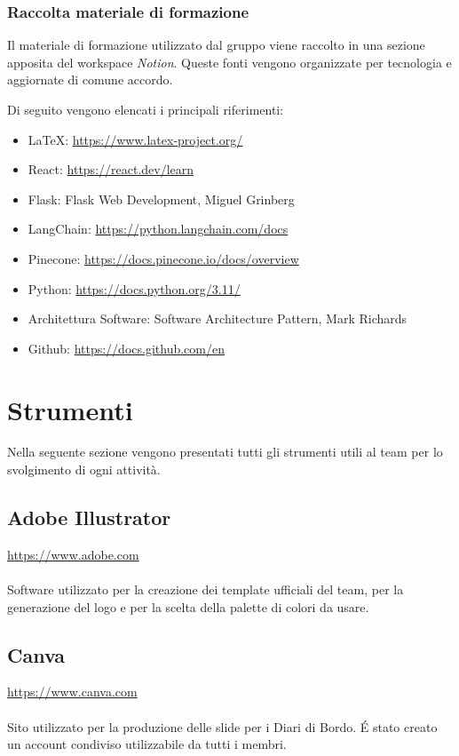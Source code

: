 \documentclass[10pt, a4paper]{article}
\begin{document}
\subsubsection{Raccolta materiale di formazione}
Il materiale di formazione utilizzato dal gruppo viene raccolto in una sezione apposita del workspace \textit{Notion}.
Queste fonti vengono organizzate per tecnologia e aggiornate di comune accordo.

Di seguito vengono elencati i principali riferimenti:
\begin{itemize}
    \item \LaTeX: \href{https://www.latex-project.org/}{https://www.latex-project.org/}
    \item React: \href{https://react.dev/learn}{https://react.dev/learn}
    \item Flask: Flask Web Development, Miguel Grinberg
    \item LangChain: \href{https://python.langchain.com/docs}{https://python.langchain.com/docs}
    \item Pinecone: \href{https://docs.pinecone.io/docs/overview}{https://docs.pinecone.io/docs/overview}
    \item Python: \href{https://docs.python.org/3.11/}{https://docs.python.org/3.11/}
    \item Architettura Software: Software Architecture Pattern, Mark Richards
    \item Github: \href{https://docs.github.com/en}{https://docs.github.com/en}
\end{itemize}

\newpage

\newpage
\section{Strumenti}
Nella seguente sezione vengono presentati tutti gli strumenti utili al team per lo svolgimento di ogni attività.

\subsection{Adobe Illustrator}
\href{https://www.adobe.com}{https://www.adobe.com}\\\\
Software utilizzato per la creazione dei template ufficiali del team, per la generazione del logo e per la scelta della palette di colori da usare. 

\subsection{Canva}
\href{https://www.canva.com}{https://www.canva.com}\\\\
Sito utilizzato per la produzione delle slide per i Diari di Bordo. É stato creato un account condiviso utilizzabile da tutti i membri.
\end{document}
